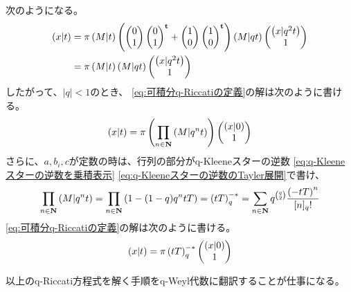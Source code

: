 {	次のようになる。
	\begin{equation*}\begin{split}
		\plr{x|t} &= \pi\plr{M|t} \plr{\pvec{0}{1}\pvec{0}{1}^\tran
			+ \pvec{1}{0}\pvec{1}{0}^\tran} \plr{M|qt}\pvec{\plr{x|q^2t}}{1} \\
		&= \pi\plr{M|t}\plr{M|qt}\pvec{\plr{x|q^2t}}{1}
	\end{split}\end{equation*}
	したがって、$|q|<1$のとき、
	\eqref{eq:可積分q-Riccatiの定義}の解は次のように書ける。
	\begin{equation*}\begin{split}
		\plr{x|t} = \pi\plr{\prod_{n\in\sizen}\plr{M|q^nt}}\pvec{\plr{x|0}}{1}
	\end{split}\end{equation*}
	さらに、$a,b_i,c$が定数の時は、行列の部分がq-Kleeneスターの逆数
	\eqref{eq:q-Kleeneスターの逆数を乗積表示}
	\eqref{eq:q-Kleeneスターの逆数のTayler展開}で書け、
	\begin{equation*}\begin{split}
		\prod_{n\in\sizen}\plr{M|q^nt}
		= \prod_{n\in\sizen}\plr{1 - (1 - q)q^ntT}
		= \plr{tT}_q^{-*}
		= \sum_{n\in\sizen} q^{\binom{q}{2}}\frac{\plr{-tT}^n}{[n]_q!}
	\end{split}\end{equation*}
	\eqref{eq:可積分q-Riccatiの定義}の解は次のように書ける。
	\begin{equation*}\begin{split}
		\plr{x|t} = \pi\plr{tT}_q^{-*}\pvec{\plr{x|0}}{1}
	\end{split}\end{equation*}

	以上のq-Riccati方程式を解く手順をq-Weyl代数に翻訳することが仕事になる。
}
